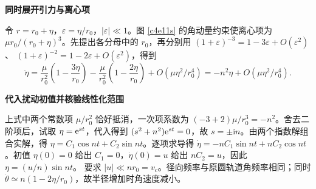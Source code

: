 \begin{solution}
\par\medskip{}\noindent\textbf{同时展开引力与离心项}\par\nobreak
令 $r=r_0+\eta$，$\varepsilon=\eta/r_0$，$|\varepsilon|\ll1$。图 \ref{c4e11s} 的角动量约束使离心项为 $\mu r_0/(r_0+\eta)^3$。先提出各分母中的 $r_0$，再分别用
$(1+\varepsilon)^{-3}=1-3\varepsilon+O(\varepsilon^2)$、
$(1+\varepsilon)^{-2}=1-2\varepsilon+O(\varepsilon^2)$，得到
\[
 \ddot\eta=\frac{\mu}{r_0^2}\left(1-\frac{3\eta}{r_0}\right)
 -\frac{\mu}{r_0^2}\left(1-\frac{2\eta}{r_0}\right)
 +O(\mu\eta^2/r_0^4)
 =-n^2\eta+O(\mu\eta^2/r_0^4).
\]



\par\medskip{}\noindent\textbf{代入扰动初值并核验线性化范围}\par\nobreak
上式中两个常数项 $\mu/r_0^2$ 恰好抵消，一次项系数为 $(-3+2)\mu/r_0^3=-n^2$。舍去二阶项后，试取 $\eta=\mathrm e^{st}$，代入得到 $(s^2+n^2)\mathrm e^{st}=0$，故 $s=\pm\mathrm i n$。由两个指数解组合实解，得 $\eta=C_1\cos nt+C_2\sin nt$。逐项求导得 $\dot\eta=-nC_1\sin nt+nC_2\cos nt$。初值 $\eta(0)=0$ 给出 $C_1=0$，$\dot\eta(0)=u$ 给出 $nC_2=u$，因此
$\boxed{\eta=(u/n)\sin nt}$。
要求 $|u|\ll nr_0=v_c$。径向频率与原圆轨道角频率相同；同时 $\dot\theta\simeq n(1-2\eta/r_0)$，故半径增加时角速度减小。
\end{solution}

